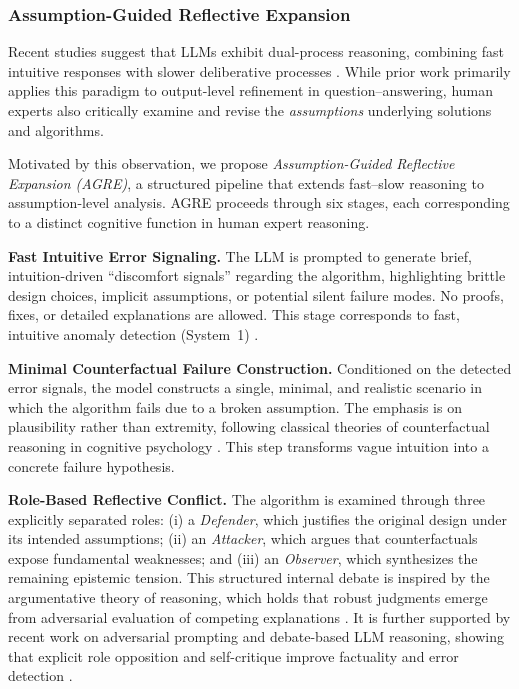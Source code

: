 \documentclass[sigconf,anonymous]{aamas}
\begin{document}
\subsubsection{Assumption-Guided Reflective Expansion}

Recent studies suggest that LLMs exhibit dual-process reasoning, combining fast intuitive responses with slower deliberative processes \cite{Hagendorff_2023,chung2025thinkerlearningthinkfast}. While prior work primarily applies this paradigm to output-level refinement in question–answering, human experts also critically examine and revise the \emph{assumptions} underlying solutions and algorithms.

Motivated by this observation, we propose \textit{Assumption-Guided Reflective Expansion (AGRE)}, a structured pipeline that extends fast–slow reasoning to assumption-level analysis. AGRE proceeds through six stages, each corresponding to a distinct cognitive function in human expert reasoning.

\textbf{Fast Intuitive Error Signaling.}
The LLM is prompted to generate brief, intuition-driven ``discomfort signals''
regarding the algorithm, highlighting brittle design choices, implicit
assumptions, or potential silent failure modes.
No proofs, fixes, or detailed explanations are allowed.
This stage corresponds to fast, intuitive anomaly detection (System~1) \cite{kahneman2011thinking}.

\textbf{Minimal Counterfactual Failure Construction.}
Conditioned on the detected error signals, the model constructs a single,
minimal, and realistic scenario in which the algorithm fails due to a broken
assumption.
The emphasis is on plausibility rather than extremity, following classical
theories of counterfactual reasoning in cognitive psychology
\cite{roese1997counterfactual}.
This step transforms vague intuition into a concrete failure hypothesis.

\textbf{Role-Based Reflective Conflict.}
The algorithm is examined through three explicitly separated roles:
(i) a \emph{Defender}, which justifies the original design under its intended assumptions;
(ii) an \emph{Attacker}, which argues that counterfactuals expose fundamental weaknesses; and
(iii) an \emph{Observer}, which synthesizes the remaining epistemic tension.
This structured internal debate is inspired by the argumentative theory of reasoning, which holds that robust judgments emerge from adversarial evaluation of competing explanations \cite{mercier2011why}. It is further supported by recent work on adversarial prompting and debate-based LLM reasoning, showing that explicit role opposition and self-critique improve factuality and error detection \cite{irving2018aisafetydebate,du2023improvingfactualityreasoninglanguage,madaan2023selfrefineiterativerefinementselffeedback}.
\end{document}
